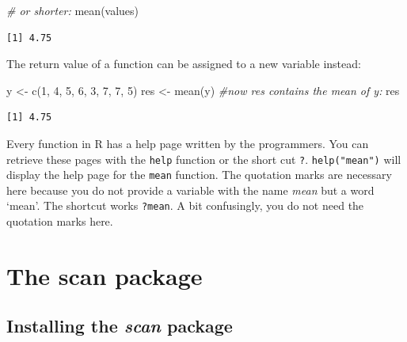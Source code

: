 \documentclass[
]{book}
\newenvironment{Shaded}{\begin{snugshade}}{\end{snugshade}}
\newcommand{\CommentTok}[1]{\textcolor[rgb]{0.56,0.35,0.01}{\textit{#1}}}
\newcommand{\DecValTok}[1]{\textcolor[rgb]{0.00,0.00,0.81}{#1}}
\newcommand{\FunctionTok}[1]{\textcolor[rgb]{0.00,0.00,0.00}{#1}}
\newcommand{\NormalTok}[1]{#1}
\newcommand{\OtherTok}[1]{\textcolor[rgb]{0.56,0.35,0.01}{#1}}
\begin{document}
\begin{Shaded}
\begin{Highlighting}[]
\CommentTok{\# or shorter:}
\FunctionTok{mean}\NormalTok{(values)}
\end{Highlighting}
\end{Shaded}

\begin{verbatim}
[1] 4.75
\end{verbatim}

The return value of a function can be assigned to a new variable instead:

\begin{Shaded}
\begin{Highlighting}[]
\NormalTok{y }\OtherTok{\textless{}{-}} \FunctionTok{c}\NormalTok{(}\DecValTok{1}\NormalTok{, }\DecValTok{4}\NormalTok{, }\DecValTok{5}\NormalTok{, }\DecValTok{6}\NormalTok{, }\DecValTok{3}\NormalTok{, }\DecValTok{7}\NormalTok{, }\DecValTok{7}\NormalTok{, }\DecValTok{5}\NormalTok{)}
\NormalTok{res }\OtherTok{\textless{}{-}} \FunctionTok{mean}\NormalTok{(y)}
\CommentTok{\#now res contains the mean of y:}
\NormalTok{res}
\end{Highlighting}
\end{Shaded}

\begin{verbatim}
[1] 4.75
\end{verbatim}

Every function in R has a help page written by the programmers. You can retrieve these pages with the \texttt{help} function or the short cut \texttt{?}. \texttt{help("mean")} will display the help page for the \texttt{mean} function. The quotation marks are necessary here because you do not provide a variable with the name \emph{mean} but a word `mean'. The shortcut works \texttt{?mean}. A bit confusingly, you do not need the quotation marks here.

\hypertarget{the-scan-package}{%
\chapter{The scan package}\label{the-scan-package}}

\hypertarget{installing-the-scan-package}{%
\section{\texorpdfstring{Installing the \emph{scan} package}{Installing the scan package}}\label{installing-the-scan-package}}
\end{document}
